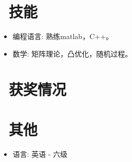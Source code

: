 \documentclass{resume}
\begin{document}

\section{\faCogs\ 技能}
\begin{itemize}[parsep=0.5ex]
  \item 编程语言: 熟练matlab，C++。
  \item 数学: 矩阵理论，凸优化，随机过程。
\end{itemize}

\section{\faHeartO\ 获奖情况}

\section{\faInfo\ 其他}
\begin{itemize}[parsep=0.5ex]
  \item 语言: 英语 - 六级
\end{itemize}
%
%
\end{document}
